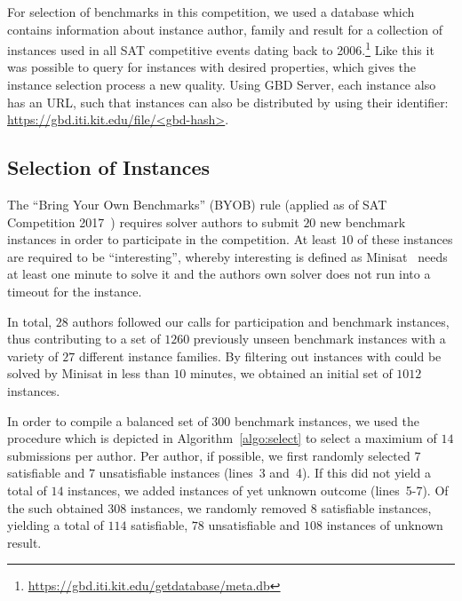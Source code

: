 \documentclass{elsarticle}
\begin{document}
For selection of benchmarks in this competition, we used a database which contains information about instance author, family and result for a collection of instances used in all SAT competitive events dating back to 2006.\footnote{\url{https://gbd.iti.kit.edu/getdatabase/meta.db}} 
Like this it was possible to query for instances with desired properties, which gives the instance selection process a new quality. 
Using GBD Server, each instance also has an URL, such that instances can also be distributed by using their identifier: \url{https://gbd.iti.kit.edu/file/<gbd-hash>}.


\subsection{Selection of Instances}

The ``Bring Your Own Benchmarks'' (BYOB) rule (applied as of SAT Competition 2017~\cite{SC2017}) requires solver authors to submit $20$ new benchmark instances in order to participate in the competition. At least $10$ of these instances are required to be ``interesting'', whereby interesting is defined as Minisat~\cite{Niklas:2003:Minisat} needs at least one minute to solve it and the authors own solver does not run into a timeout for the instance. 

In total, $28$ authors followed our calls for participation and benchmark instances, thus contributing to a set of $1260$ previously unseen benchmark instances with a variety of $27$ different instance families. 
By filtering out instances with could be solved by Minisat in less than $10$ minutes, we obtained an initial set of $1012$ instances. 

In order to compile a balanced set of $300$ benchmark instances, we used the procedure which is depicted in Algorithm~\ref{algo:select} to select a maximium of $14$ submissions per author. 
Per author, if possible, we first randomly selected $7$ satisfiable and $7$ unsatisfiable instances (lines~3 and~4). 
If this did not yield a total of $14$ instances, we added instances of yet unknown outcome (lines~5-7). 
Of the such obtained $308$ instances, we randomly removed $8$ satisfiable instances, yielding a total of $114$ satisfiable, $78$ unsatisfiable and $108$ instances of unknown result. 
\end{document}
